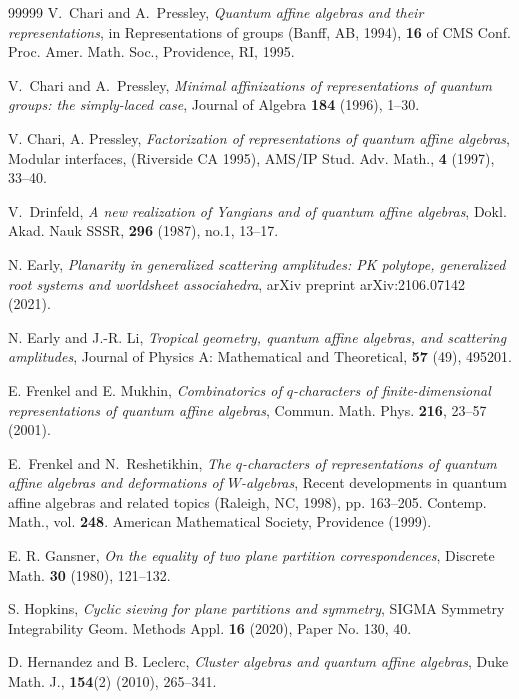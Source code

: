 \documentclass[12pt, reqno]{amsart}
\theoremstyle{plain}
\theoremstyle{definition}
\numberwithin{equation}{section}
\begin{document}
\begin{thebibliography}{99999}
V.~Chari and A.~Pressley, \textit{Quantum affine algebras and their representations}, in Representations of groups ({B}anff, {AB}, 1994),
\textbf{16} of CMS Conf. Proc. Amer. Math. Soc., Providence, RI, {1995}.
  
V.~Chari and A.~Pressley, \textit{Minimal affinizations of representations of quantum groups: the simply-laced case}, Journal of Algebra \textbf{184} (1996), 1--30.

 V. Chari, A. Pressley, \textit{Factorization of representations of quantum affine algebras}, Modular interfaces, (Riverside CA 1995), AMS/IP Stud. Adv. Math., \textbf{4} (1997), 33--40. 

V.~Drinfeld, \textit{A new realization of Yangians and of quantum affine algebras},
Dokl. Akad. Nauk SSSR, \textbf{296} (1987), no.1, 13--17.

 N. Early, \textit{Planarity in generalized scattering amplitudes: PK polytope, generalized root systems and worldsheet associahedra}, arXiv preprint arXiv:2106.07142 (2021).

 N. Early and J.-R. Li, \textit{Tropical geometry, quantum affine algebras, and scattering amplitudes}, Journal of Physics A: Mathematical and Theoretical, \textbf{57} (49), 495201. 

 E. Frenkel and E. Mukhin, \textit{Combinatorics of $q$-characters of finite-dimensional representations of quantum affine algebras}, Commun. Math. Phys. \textbf{216}, 23--57 (2001).

E.~Frenkel and N.~Reshetikhin, \textit{The $q$-characters of representations of quantum affine algebras and deformations of $W$-algebras}, Recent developments in quantum affine algebras and related topics (Raleigh, NC, 1998), pp. 163--205. Contemp. Math., vol. \textbf{248}. American Mathematical Society, Providence (1999). 

 E. R. Gansner, \textit{On the equality of two plane partition correspondences}, Discrete Math. \textbf{30} (1980), 121--132.

 S. Hopkins, \textit{Cyclic sieving for plane partitions and symmetry}, SIGMA Symmetry
Integrability Geom. Methods Appl. \textbf{16} (2020), Paper No. 130, 40.

 D. Hernandez and B. Leclerc, \textit{Cluster algebras and quantum affine algebras}, Duke Math. J., \textbf{154}(2) (2010), 265--341.


\end{thebibliography}
\end{document}
